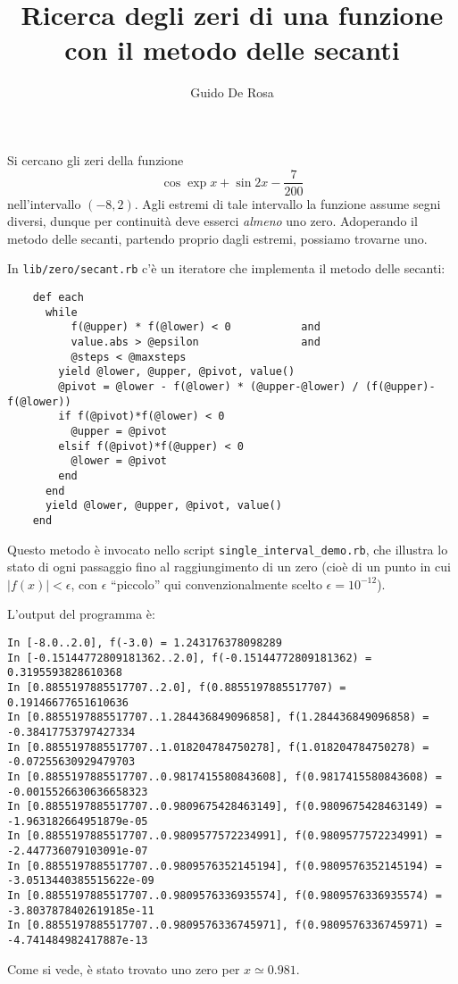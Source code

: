 \documentclass[a4paper]{article}
\author{Guido De Rosa}
\begin{document}
\title{Ricerca degli zeri di una funzione con il metodo delle secanti}

\maketitle


Si cercano gli zeri della funzione
\[
  \cos{\exp{x}} + \sin{2x} - \frac{7}{200} 
\]
nell'intervallo $(-8, 2)$. Agli estremi di tale intervallo la funzione
assume segni diversi, dunque per continuità deve esserci \emph{almeno}
uno zero. Adoperando il metodo delle secanti, partendo proprio dagli estremi,
possiamo trovarne uno. 

In \texttt{lib/zero/secant.rb} c'è un iteratore che implementa il metodo 
delle secanti:
\begin{lstlisting}
    def each
      while
          f(@upper) * f(@lower) < 0           and
          value.abs > @epsilon                and
          @steps < @maxsteps
        yield @lower, @upper, @pivot, value()
        @pivot = @lower - f(@lower) * (@upper-@lower) / (f(@upper)-f(@lower))
        if f(@pivot)*f(@lower) < 0
          @upper = @pivot
        elsif f(@pivot)*f(@upper) < 0
          @lower = @pivot
        end
      end
      yield @lower, @upper, @pivot, value()
    end
\end{lstlisting}

Questo metodo è invocato nello script \texttt{single\_interval\_demo.rb},
che illustra lo stato di ogni passaggio fino al raggiungimento di un zero
(cioè di un punto in cui $|f(x)| < \epsilon$, con $\epsilon$ ``piccolo''
qui convenzionalmente scelto $\epsilon = 10^{-12}$).

L'output del programma è:
\begin{lstlisting}
In [-8.0..2.0], f(-3.0) = 1.243176378098289
In [-0.15144772809181362..2.0], f(-0.15144772809181362) = 0.3195593828610368
In [0.8855197885517707..2.0], f(0.8855197885517707) = 0.19146677651610636
In [0.8855197885517707..1.284436849096858], f(1.284436849096858) = -0.38417753797427334
In [0.8855197885517707..1.018204784750278], f(1.018204784750278) = -0.07255630929479703
In [0.8855197885517707..0.9817415580843608], f(0.9817415580843608) = -0.0015526630636658323
In [0.8855197885517707..0.9809675428463149], f(0.9809675428463149) = -1.963182664951879e-05
In [0.8855197885517707..0.9809577572234991], f(0.9809577572234991) = -2.447736079103091e-07
In [0.8855197885517707..0.9809576352145194], f(0.9809576352145194) = -3.0513440385515622e-09
In [0.8855197885517707..0.9809576336935574], f(0.9809576336935574) = -3.8037878402619185e-11
In [0.8855197885517707..0.9809576336745971], f(0.9809576336745971) = -4.741484982417887e-13
\end{lstlisting}
Come si vede, è stato trovato uno zero per $x \simeq 0.981$.
\end{document}
